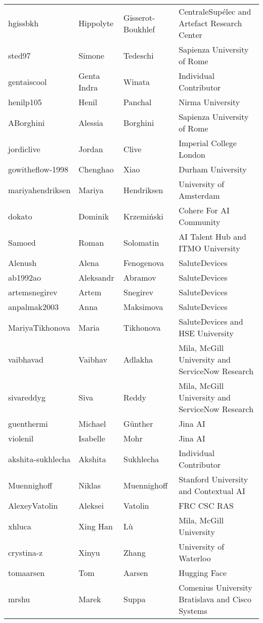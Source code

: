 \begin{table*}
{\begin{tabular}{llll}
hgissbkh & Hippolyte & Gisserot-Boukhlef & CentraleSupélec and Artefact Research Center \\
sted97 & Simone & Tedeschi & Sapienza University of Rome \\
gentaiscool & Genta Indra & Winata & Individual Contributor \\
henilp105 & Henil & Panchal & Nirma University \\
ABorghini & Alessia & Borghini & Sapienza University of Rome \\
jordiclive & Jordan & Clive & Imperial College London \\
gowitheflow-1998 & Chenghao & Xiao & Durham University \\
mariyahendriksen & Mariya & Hendriksen & University of Amsterdam \\
dokato & Dominik & Krzemiński & Cohere For AI Community \\
Samoed & Roman & Solomatin & AI Talent Hub and ITMO University \\
Alenush & Alena & Fenogenova & SaluteDevices \\
ab1992ao & Aleksandr & Abramov & SaluteDevices \\
artemsnegirev & Artem & Snegirev & SaluteDevices \\
anpalmak2003 & Anna & Maksimova & SaluteDevices \\
MariyaTikhonova & Maria & Tikhonova & SaluteDevices and HSE University \\
vaibhavad & Vaibhav & Adlakha & Mila, McGill University and ServiceNow Research \\
sivareddyg & Siva & Reddy & Mila, McGill University and ServiceNow Research \\
guenthermi & Michael & Günther & Jina AI \\
violenil & Isabelle & Mohr & Jina AI \\
akshita-sukhlecha & Akshita & Sukhlecha & Individual Contributor \\
Muennighoff & Niklas & Muennighoff & Stanford University and Contextual AI \\
AlexeyVatolin & Aleksei & Vatolin & FRC CSC RAS \\
xhluca & Xing Han & Lù & Mila, McGill University \\
crystina-z & Xinyu & Zhang & University of Waterloo \\
tomaarsen & Tom & Aarsen & Hugging Face \\
mrshu & Marek & Suppa & Comenius University Bratislava and Cisco Systems \\

\end{tabular}}
\end{table*}
